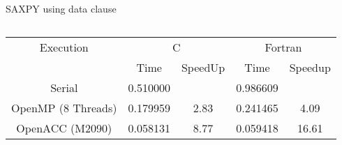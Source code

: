 \documentclass[c,mathserif,compress,xcolor=svgnames]{beamer}
\newenvironment{eblock}[0]
{
\begin{beamerboxesrounded}[upper=uppercol2,lower=lowercol2,shadow=true]}
{\end{beamerboxesrounded}}
\begin{document}
\begin{frame}{\small SAXPY using data clause}
%      
%      
  \begin{columns}
    \begin{eblock}{}
      \begin{tabular}{|c|c|c|c|c|}
        \hline
        Execution& \multicolumn{2}{c|}{C}& \multicolumn{2}{c|}{Fortran} \\
        \cline{2-5}
        &  Time & SpeedUp & Time & Speedup \\
        \hline
        Serial & 0.510000 & & 0.986609 & \\
        OpenMP (8 Threads) & 0.179959 & 2.83 & 0.241465 & 4.09 \\
        OpenACC (M2090) & 0.058131 & 8.77 & 0.059418 & 16.61 \\
          \hline
      \end{tabular}
    \end{eblock}
  \end{columns}
\end{frame}
\end{document}
